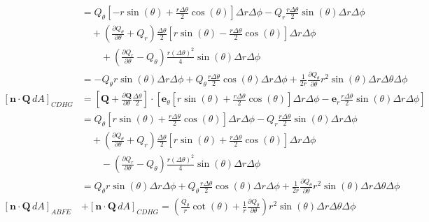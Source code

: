 \documentclass[a4paper]{article}
\begin{document}
\begin{align*}
							    & = Q_{\theta}\!\left[ -r \sin\!\left(\theta\right) + \frac{r \Delta \theta}{2}\cos\!\left(\theta\right) \right]\Delta r \Delta \phi - Q_{r}\frac{r \Delta \theta}{2}\sin\!\left(\theta\right)\Delta r \Delta \phi \\
							    & \quad + \!\left( \frac{\partial Q_{\theta}}{\partial \theta} + Q_{r} \right)\frac{\Delta \theta}{2}\!\left[ r \sin\!\left(\theta\right) - \frac{r \Delta \theta}{2}\cos\!\left(\theta\right) \right]\Delta r \Delta \phi \\
							    & \qquad + \!\left( \frac{\partial Q_{r}}{\partial \theta} - Q_{\theta} \right)\frac{r \!\left( \Delta \theta \right)^{2}}{4}\sin\!\left(\theta\right)\Delta r \Delta \phi \\
							    & = -Q_{\theta}r \sin\!\left(\theta\right)\Delta r \Delta \phi + Q_{\theta}\frac{r \Delta \theta}{2}\cos\!\left(\theta\right)\Delta r \Delta \phi + \frac{1}{2r}\frac{\partial Q_{\theta}}{\partial \theta}r^{2}\sin\!\left(\theta\right)\Delta r \Delta \theta \Delta \phi \\
	\!\left[ \pmb{n} \cdot \pmb{Q} \, dA \right]_{CDHG} & = \!\left[ \pmb{Q} + \frac{\partial \pmb{Q}}{\partial \theta}\frac{\Delta \theta}{2} \right] \cdot \!\left[ \pmb{e}_{\theta}\!\left[ r \sin\!\left(\theta\right) + \frac{r \Delta \theta}{2}\cos\!\left(\theta\right) \right]\Delta r \Delta \phi - \pmb{e}_{r}\frac{r \Delta \theta}{2}\sin\!\left(\theta\right)\Delta r \Delta \phi \right] \\
							    & = Q_{\theta}\!\left[ r \sin\!\left(\theta\right) + \frac{r \Delta \theta}{2}\cos\!\left(\theta\right) \right]\Delta r \Delta \phi - Q_{r}\frac{r \Delta \theta}{2}\sin\!\left(\theta\right)\Delta r \Delta \phi \\
							    & \quad + \!\left( \frac{\partial Q_{\theta}}{\partial \theta} + Q_{r} \right)\frac{\Delta \theta}{2}\!\left[ r \sin\!\left(\theta\right) + \frac{r \Delta \theta}{2}\cos\!\left(\theta\right) \right]\Delta r \Delta \phi \\
							    & \qquad - \!\left( \frac{\partial Q_{r}}{\partial \theta} - Q_{\theta} \right)\frac{r \!\left( \Delta \theta \right)^{2}}{4}\sin\!\left(\theta\right)\Delta r \Delta \phi \\
							    & = Q_{\theta}r \sin\!\left(\theta\right)\Delta r \Delta \phi + Q_{\theta}\frac{r \Delta \theta}{2}\cos\!\left(\theta\right)\Delta r \Delta \phi + \frac{1}{2r}\frac{\partial Q_{\theta}}{\partial \theta}r^{2}\sin\!\left(\theta\right)\Delta r \Delta \theta \Delta \phi \\
	\!\left[ \pmb{n} \cdot \pmb{Q} \, dA \right]_{ABFE} & + \!\left[ \pmb{n} \cdot \pmb{Q} \, dA \right]_{CDHG} = \boxed{\!\left( \frac{Q_{\theta}}{r}\cot\!\left(\theta\right) + \frac{1}{r}\frac{\partial Q_{\theta}}{\partial \theta} \right)r^{2}\sin\!\left(\theta\right)\Delta r \Delta \theta \Delta \phi} 
\end{align*}
\end{document}
